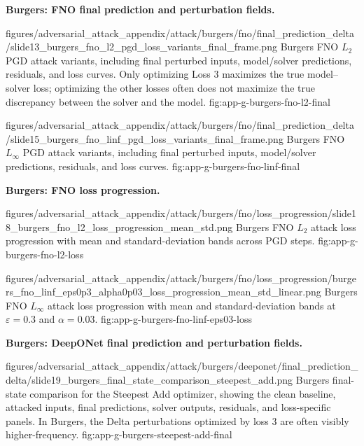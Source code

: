 \documentclass[letterpaper]{article} %
\begin{document}
\noindent\textbf{Burgers: FNO final prediction and perturbation fields.}

\clearpage

\appendixattackfigcompact
  {figures/adversarial_attack_appendix/attack/burgers/fno/final_prediction_delta/slide13_burgers_fno_l2_pgd_loss_variants_final_frame.png}
  {Burgers FNO $L_2$ PGD attack variants, including final perturbed inputs,
  model/solver predictions, residuals, and loss curves. Only optimizing Loss 3
  maximizes the true model--solver loss; optimizing the other losses often does
  not maximize the true discrepancy between the solver and the model.}
  {fig:app-g-burgers-fno-l2-final}

\appendixattackfigcompact
  {figures/adversarial_attack_appendix/attack/burgers/fno/final_prediction_delta/slide15_burgers_fno_linf_pgd_loss_variants_final_frame.png}
  {Burgers FNO $L_\infty$ PGD attack variants, including final perturbed
  inputs, model/solver predictions, residuals, and loss curves.}
  {fig:app-g-burgers-fno-linf-final}

\clearpage

\noindent\textbf{Burgers: FNO loss progression.}

\appendixattackfig
  {figures/adversarial_attack_appendix/attack/burgers/fno/loss_progression/slide18_burgers_fno_l2_loss_progression_mean_std.png}
  {Burgers FNO $L_2$ attack loss progression with mean and standard-deviation
  bands across PGD steps.}
  {fig:app-g-burgers-fno-l2-loss}

\appendixattackfig
  {figures/adversarial_attack_appendix/attack/burgers/fno/loss_progression/burgers_fno_linf_eps0p3_alpha0p03_loss_progression_mean_std_linear.png}
  {Burgers FNO $L_\infty$ attack loss progression with mean and
  standard-deviation bands at $\varepsilon=0.3$ and $\alpha=0.03$.}
  {fig:app-g-burgers-fno-linf-eps03-loss}

\FloatBarrier
\noindent\textbf{Burgers: DeepONet final prediction and perturbation fields.}


\appendixattackfig
  {figures/adversarial_attack_appendix/attack/burgers/deeponet/final_prediction_delta/slide19_burgers_final_state_comparison_steepest_add.png}
  {Burgers final-state comparison for the Steepest Add optimizer, showing the
  clean baseline, attacked inputs, final predictions, solver outputs, residuals,
  and loss-specific panels. In Burgers, the Delta perturbations optimized by
  loss 3 are often visibly higher-frequency.}
  {fig:app-g-burgers-steepest-add-final}
\end{document}
